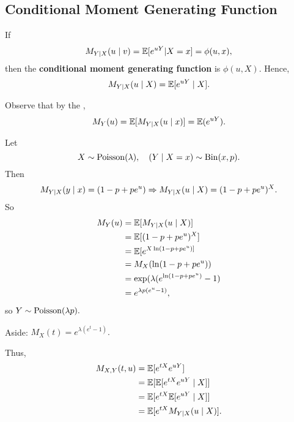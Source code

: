 
\subsection{Conditional Moment Generating Function}
\begin{definition}
If
$$M_{Y\mid X}(u\mid v) = \mathbb E[e^{uY}|X=x]=\phi(u,x),$$
then the \textbf{conditional moment generating function} is $\phi(u,X).$ Hence,
$$
M_{Y\mid X}(u\mid X)=\mathbb E[e^{uY}\mid X].
$$
\end{definition}

Observe that by the ,
$$
M_Y(u)=\mathbb E[M_{Y\mid X}(u\mid x)] =\mathbb E(e^{uY}).
$$

\begin{eg}
Let
$$X\sim \operatorname*{Poisson}(\lambda), \quad (Y\mid X=x)\sim \operatorname*{Bin}(x,p).$$
Then
$$M_{Y\mid X}(y\mid x)=(1-p+pe^u)\Rightarrow M_{Y\mid X}(u\mid X)=(1-p+pe^u)^X.$$
So
\begin{align*}
    M_Y(u)&=\mathbb E[M_{Y\mid X}(u\mid X)]\\
    &=\mathbb E[(1-p+pe^u)^X]\\
    &=\mathbb E[e^{X\ln(1-p+pe^u)]}\\
    &=M_X(\ln(1-p+pe^u)) \\
    &=\exp(\lambda(e^{\ln(1-p+pe^u)}-1) \\
    &=e^{\lambda p(e^u-1)},
\end{align*}
so $Y\sim \operatorname*{Poisson}(\lambda p).$
\begin{remark}
		Aside: $M_X(t)=e^{\lambda(e^t-1)}.$
\end{remark}
Thus, 
\begin{align*}
    M_{X,Y}(t,u)&=\mathbb E[e^{tX}e^{uY}]\\
    &=\mathbb E[\mathbb E[e^{tX}e^{uY}\mid X]]\\
    &=\mathbb E[e^{tX}\mathbb E[e^{uY}\mid X]] \\
    &=\mathbb E[e^{tX}M_{Y\mid X}(u\mid X)].
\end{align*}
\end{eg}


